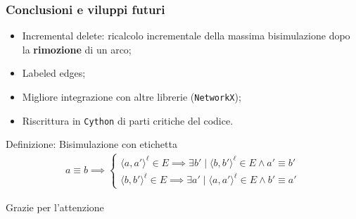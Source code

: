 \documentclass{beamer}
\begin{document}
\begin{frame}\frametitle{Conclusioni e viluppi futuri}
    \begin{itemize}
        \item Incremental delete: ricalcolo incrementale della massima bisimulazione dopo la \textbf{rimozione} di un arco;
        \item Labeled edges;
        \item Migliore integrazione con altre librerie (\texttt{NetworkX});
        \item Riscrittura in \texttt{Cython} di parti critiche del codice.
    \end{itemize}

    \begin{block}{Definizione: Bisimulazione con etichetta}
        \begin{gather*}
            a \equiv b \implies
            \begin{cases}
                \langle a, a' \rangle^\ell \in E \implies \exists b' \mid \langle b, b' \rangle^\ell \in E \land a' \equiv b'\\
                \langle b, b' \rangle^\ell \in E \implies \exists a' \mid \langle a, a' \rangle^\ell \in E \land b' \equiv a'
            \end{cases}
        \end{gather*}
    \end{block}
\end{frame}

\begin{frame}
    Grazie per l'attenzione
\end{frame}
\end{document}
